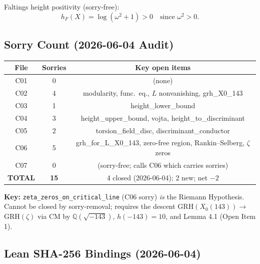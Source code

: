 \documentclass[12pt,letterpaper]{article}
\begin{document}
Faltings height positivity (sorry-free):
\begin{equation}
  h_F(X) = \log(\omega^2 + 1) > 0
  \quad\text{since }\omega^2 > 0.
\end{equation}

\subsection{Sorry Count (2026-06-04 Audit)}

\begin{center}
\begin{tabular}{ccc}
\toprule
File & Sorries & Key open items \\
\midrule
C01 & 0 & (none) \\
C02 & 4 & modularity, func.\ eq., $L$ nonvanishing, grh\_X0\_143 \\
C03 & 1 & height\_lower\_bound \\
C04 & 3 & height\_upper\_bound, vojta, height\_to\_discriminant \\
C05 & 2 & torsion\_field\_disc, discriminant\_conductor \\
C06 & 5 & grh\_for\_L\_X0\_143, zero-free region,
          Rankin--Selberg, $\zeta$ zeros \\
C07 & 0 & (sorry-free; calls C06 which carries sorries) \\
\midrule
\textbf{TOTAL} & \textbf{15} &
  4 closed (2026-06-04); 2 new; net $-2$ \\
\bottomrule
\end{tabular}
\end{center}

\textbf{Key:} \texttt{zeta\_zeros\_on\_critical\_line} (C06 sorry)
\emph{is} the Riemann Hypothesis. Cannot be closed by sorry-removal;
requires the descent GRH$(X_0(143)) \to$ GRH$(\zeta)$ via CM by
$\mathbb{Q}(\sqrt{-143})$, $h(-143) = 10$, and Lemma 4.1 (Open Item 1).

\subsection{Lean SHA-256 Bindings (2026-06-04)}
\end{document}
